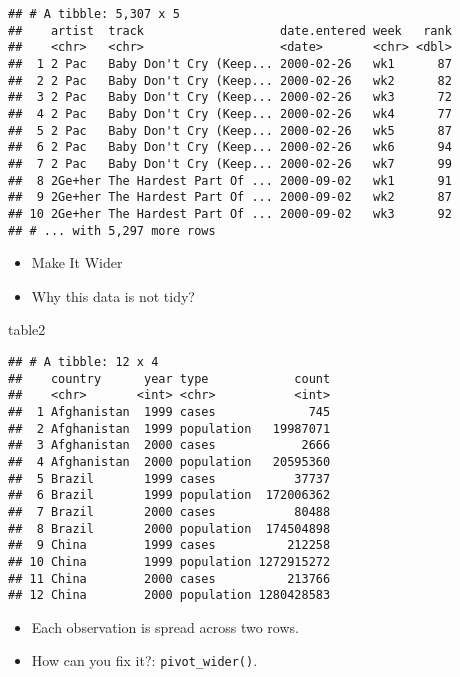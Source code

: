 \documentclass[
]{book}
\newenvironment{Shaded}{\begin{snugshade}}{\end{snugshade}}
\newcommand{\NormalTok}[1]{#1}
\begin{document}
\begin{verbatim}
## # A tibble: 5,307 x 5
##    artist  track                   date.entered week   rank
##    <chr>   <chr>                   <date>       <chr> <dbl>
##  1 2 Pac   Baby Don't Cry (Keep... 2000-02-26   wk1      87
##  2 2 Pac   Baby Don't Cry (Keep... 2000-02-26   wk2      82
##  3 2 Pac   Baby Don't Cry (Keep... 2000-02-26   wk3      72
##  4 2 Pac   Baby Don't Cry (Keep... 2000-02-26   wk4      77
##  5 2 Pac   Baby Don't Cry (Keep... 2000-02-26   wk5      87
##  6 2 Pac   Baby Don't Cry (Keep... 2000-02-26   wk6      94
##  7 2 Pac   Baby Don't Cry (Keep... 2000-02-26   wk7      99
##  8 2Ge+her The Hardest Part Of ... 2000-09-02   wk1      91
##  9 2Ge+her The Hardest Part Of ... 2000-09-02   wk2      87
## 10 2Ge+her The Hardest Part Of ... 2000-09-02   wk3      92
## # ... with 5,297 more rows
\end{verbatim}

\begin{itemize}
\item
  Make It Wider
\item
  Why this data is not tidy?
\end{itemize}

\begin{Shaded}
\begin{Highlighting}[]
\NormalTok{table2}
\end{Highlighting}
\end{Shaded}

\begin{verbatim}
## # A tibble: 12 x 4
##    country      year type            count
##    <chr>       <int> <chr>           <int>
##  1 Afghanistan  1999 cases             745
##  2 Afghanistan  1999 population   19987071
##  3 Afghanistan  2000 cases            2666
##  4 Afghanistan  2000 population   20595360
##  5 Brazil       1999 cases           37737
##  6 Brazil       1999 population  172006362
##  7 Brazil       2000 cases           80488
##  8 Brazil       2000 population  174504898
##  9 China        1999 cases          212258
## 10 China        1999 population 1272915272
## 11 China        2000 cases          213766
## 12 China        2000 population 1280428583
\end{verbatim}

\begin{itemize}
\item
  Each observation is spread across two rows.
\item
  How can you fix it?: \texttt{pivot\_wider()}.
\end{itemize}
\end{document}
